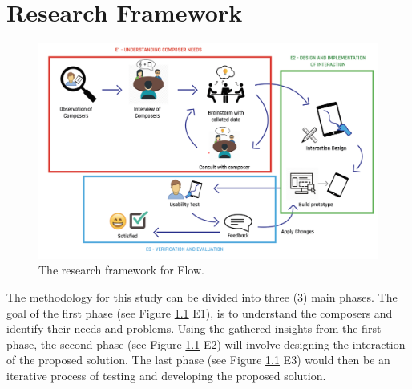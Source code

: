 %
%
%                 

\chapter{Research Framework}

	\begin{figure}[H]
		\centering
		\includegraphics[scale=0.42]{figures/research_framework_sectioned.png}
	    \caption{The research framework for Flow.}
	    \label{fig:research_framework}
	\end{figure}

	The methodology for this study can be divided into three (3) main phases. The goal of the first phase (see Figure \ref{fig:research_framework} E1), is to understand the composers and identify their needs and problems. Using the gathered insights from the first phase, the second phase (see Figure \ref{fig:research_framework} E2)  will involve designing the interaction of the proposed solution. The last phase (see Figure \ref{fig:research_framework} E3) would then be an iterative process of testing and developing the proposed solution.


